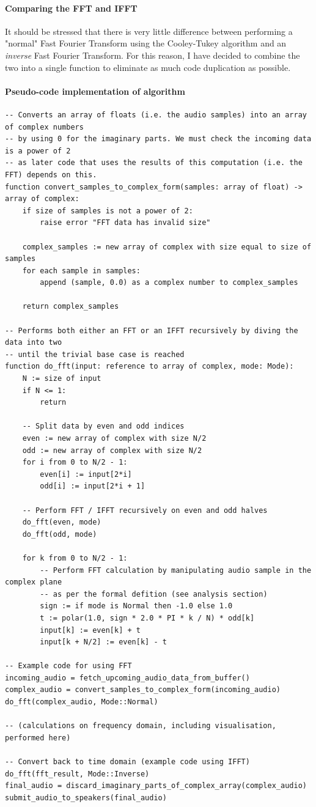 \paragraph{Comparing the FFT and IFFT}
It should be stressed that there is very little difference between performing a "normal" Fast Fourier Transform using the Cooley-Tukey algorithm and an \textit{inverse} Fast Fourier Transform. For this reason, I have decided to combine the two into a single function to eliminate as much code duplication as possible.

\pagebreak
\paragraph{Pseudo-code implementation of algorithm}
\begin{verbatim}
-- Converts an array of floats (i.e. the audio samples) into an array of complex numbers
-- by using 0 for the imaginary parts. We must check the incoming data is a power of 2
-- as later code that uses the results of this computation (i.e. the FFT) depends on this.
function convert_samples_to_complex_form(samples: array of float) -> array of complex:
	if size of samples is not a power of 2:
		raise error "FFT data has invalid size"

	complex_samples := new array of complex with size equal to size of samples
	for each sample in samples:
		append (sample, 0.0) as a complex number to complex_samples

	return complex_samples

-- Performs both either an FFT or an IFFT recursively by diving the data into two
-- until the trivial base case is reached
function do_fft(input: reference to array of complex, mode: Mode):
	N := size of input
	if N <= 1:
		return

	-- Split data by even and odd indices
	even := new array of complex with size N/2
	odd := new array of complex with size N/2
	for i from 0 to N/2 - 1:
		even[i] := input[2*i]
		odd[i] := input[2*i + 1]

	-- Perform FFT / IFFT recursively on even and odd halves
	do_fft(even, mode)
	do_fft(odd, mode)

	for k from 0 to N/2 - 1:
		-- Perform FFT calculation by manipulating audio sample in the complex plane
		-- as per the formal defition (see analysis section)
		sign := if mode is Normal then -1.0 else 1.0
		t := polar(1.0, sign * 2.0 * PI * k / N) * odd[k]
		input[k] := even[k] + t
		input[k + N/2] := even[k] - t

-- Example code for using FFT
incoming_audio = fetch_upcoming_audio_data_from_buffer()
complex_audio = convert_samples_to_complex_form(incoming_audio)
do_fft(complex_audio, Mode::Normal)

-- (calculations on frequency domain, including visualisation, performed here)

-- Convert back to time domain (example code using IFFT)
do_fft(fft_result, Mode::Inverse)
final_audio = discard_imaginary_parts_of_complex_array(complex_audio)
submit_audio_to_speakers(final_audio)
\end{verbatim}

